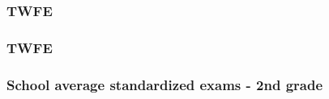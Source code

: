 \documentclass{beamer}
\begin{document}
\begin{frame}
    \label{update_scott}
    \frametitle{TWFE}
 {
    }
\end{frame}

\begin{frame}
    \label{update_scott}
    \frametitle{TWFE}
 {
    }
\end{frame}


\begin{frame}
    \label{update_scott}
    \frametitle{School average standardized exams - 2nd grade}
        {
    }
\end{frame}
\end{document}
